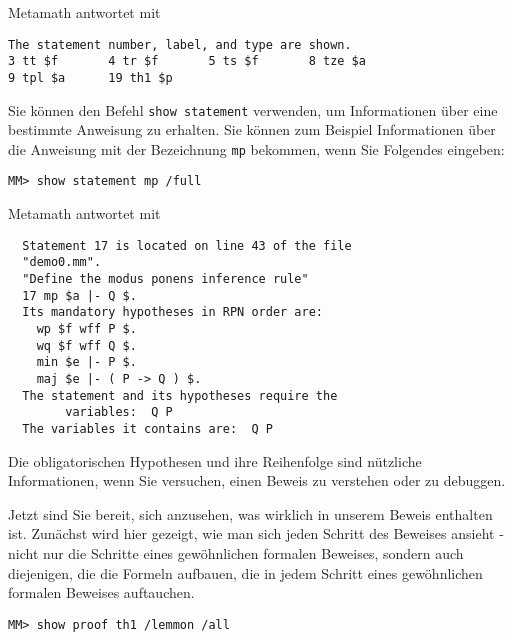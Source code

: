 Metamath antwortet mit
\begin{verbatim}
The statement number, label, and type are shown.
3 tt $f       4 tr $f       5 ts $f       8 tze $a
9 tpl $a      19 th1 $p
\end{verbatim}

Sie können den Befehl \texttt{show statement} verwenden, um Informationen über eine bestimmte Anweisung zu erhalten.
Sie können zum Beispiel Informationen über die Anweisung mit der Bezeichnung \texttt{mp} bekommen, wenn Sie Folgendes eingeben:
\begin{verbatim}
MM> show statement mp /full
\end{verbatim}
Metamath antwortet mit
\begin{verbatim}
  Statement 17 is located on line 43 of the file
  "demo0.mm".
  "Define the modus ponens inference rule"
  17 mp $a |- Q $.
  Its mandatory hypotheses in RPN order are:
    wp $f wff P $.
    wq $f wff Q $.
    min $e |- P $.
    maj $e |- ( P -> Q ) $.
  The statement and its hypotheses require the
        variables:  Q P
  The variables it contains are:  Q P
\end{verbatim}
Die obligatorischen Hypothesen und ihre Reihenfolge sind nützliche Informationen, wenn Sie versuchen, einen Beweis zu verstehen oder zu debuggen.

Jetzt sind Sie bereit, sich anzusehen, was wirklich in unserem Beweis enthalten ist.  Zunächst wird hier gezeigt, wie man sich jeden Schritt des Beweises ansieht - nicht nur die Schritte eines gewöhnlichen formalen Beweises, sondern auch diejenigen, die die Formeln aufbauen, die in jedem Schritt eines gewöhnlichen formalen Beweises auftauchen.
\begin{verbatim}
MM> show proof th1 /lemmon /all
\end{verbatim}

